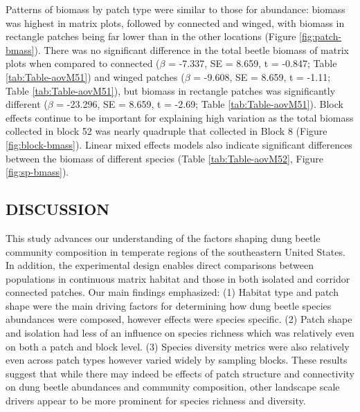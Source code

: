 \documentclass[
  man, donotrepeattitle]{apa6}
\begin{document}
Patterns of biomass by patch type were similar to those for abundance: biomass was highest in matrix plots, followed by connected and winged, with biomass in rectangle patches being far lower than in the other locations (Figure \ref{fig:patch-bmass}). There was no significant difference in the total beetle biomass of matrix plots when compared to connected (\(\beta\) = -7.337, SE = 8.659, t = -0.847; Table \ref{tab:Table-aovM51}) and winged patches (\(\beta\) = -9.608, SE = 8.659, t = -1.11; Table \ref{tab:Table-aovM51}), but biomass in rectangle patches was significantly different (\(\beta\) = -23.296, SE = 8.659, t = -2.69; Table \ref{tab:Table-aovM51}). Block effects continue to be important for explaining high variation as the total biomass collected in block 52 was nearly quadruple that collected in Block 8 (Figure \ref{fig:block-bmass}). Linear mixed effects models also indicate significant differences between the biomass of different species (Table \ref{tab:Table-aovM52}, Figure \ref{fig:sp-bmass}).

\subsection{DISCUSSION}\label{discussion}

This study advances our understanding of the factors shaping dung beetle community composition in temperate regions of the southeastern United States. In addition, the experimental design enables direct comparisons between populations in continuous matrix habitat and those in both isolated and corridor connected patches. Our main findings emphasized: (1) Habitat type and patch shape were the main driving factors for determining how dung beetle species abundances were composed, however effects were species specific. (2) Patch shape and isolation had less of an influence on species richness which was relatively even on both a patch and block level. (3) Species diversity metrics were also relatively even across patch types however varied widely by sampling blocks. These results suggest that while there may indeed be effects of patch structure and connectivity on dung beetle abundances and community composition, other landscape scale drivers appear to be more prominent for species richness and diversity.
\end{document}
